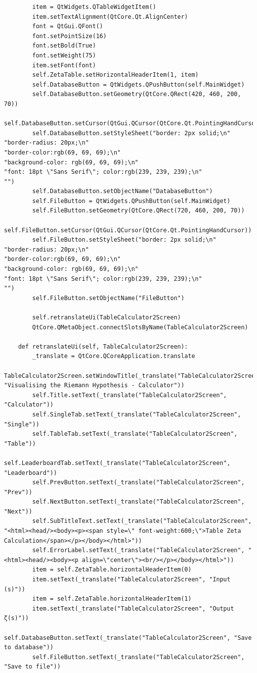 \documentclass{article}
\begin{document}
\begin{lstlisting}
        item = QtWidgets.QTableWidgetItem()
        item.setTextAlignment(QtCore.Qt.AlignCenter)
        font = QtGui.QFont()
        font.setPointSize(16)
        font.setBold(True)
        font.setWeight(75)
        item.setFont(font)
        self.ZetaTable.setHorizontalHeaderItem(1, item)
        self.DatabaseButton = QtWidgets.QPushButton(self.MainWidget)
        self.DatabaseButton.setGeometry(QtCore.QRect(420, 460, 200, 70))
        self.DatabaseButton.setCursor(QtGui.QCursor(QtCore.Qt.PointingHandCursor))
        self.DatabaseButton.setStyleSheet("border: 2px solid;\n"
"border-radius: 20px;\n"
"border-color:rgb(69, 69, 69);\n"
"background-color: rgb(69, 69, 69);\n"
"font: 18pt \"Sans Serif\"; color:rgb(239, 239, 239);\n"
"")
        self.DatabaseButton.setObjectName("DatabaseButton")
        self.FileButton = QtWidgets.QPushButton(self.MainWidget)
        self.FileButton.setGeometry(QtCore.QRect(720, 460, 200, 70))
        self.FileButton.setCursor(QtGui.QCursor(QtCore.Qt.PointingHandCursor))
        self.FileButton.setStyleSheet("border: 2px solid;\n"
"border-radius: 20px;\n"
"border-color:rgb(69, 69, 69);\n"
"background-color: rgb(69, 69, 69);\n"
"font: 18pt \"Sans Serif\"; color:rgb(239, 239, 239);\n"
"")
        self.FileButton.setObjectName("FileButton")

        self.retranslateUi(TableCalculator2Screen)
        QtCore.QMetaObject.connectSlotsByName(TableCalculator2Screen)

    def retranslateUi(self, TableCalculator2Screen):
        _translate = QtCore.QCoreApplication.translate
        TableCalculator2Screen.setWindowTitle(_translate("TableCalculator2Screen", "Visualising the Riemann Hypothesis - Calculator"))
        self.Title.setText(_translate("TableCalculator2Screen", "Calculator"))
        self.SingleTab.setText(_translate("TableCalculator2Screen", "Single"))
        self.TableTab.setText(_translate("TableCalculator2Screen", "Table"))
        self.LeaderboardTab.setText(_translate("TableCalculator2Screen", "Leaderboard"))
        self.PrevButton.setText(_translate("TableCalculator2Screen", "Prev"))
        self.NextButton.setText(_translate("TableCalculator2Screen", "Next"))
        self.SubTitleText.setText(_translate("TableCalculator2Screen", "<html><head/><body><p><span style=\" font-weight:600;\">Table Zeta Calculation</span></p></body></html>"))
        self.ErrorLabel.setText(_translate("TableCalculator2Screen", "<html><head/><body><p align=\"center\"><br/></p></body></html>"))
        item = self.ZetaTable.horizontalHeaderItem(0)
        item.setText(_translate("TableCalculator2Screen", "Input (s)"))
        item = self.ZetaTable.horizontalHeaderItem(1)
        item.setText(_translate("TableCalculator2Screen", "Output ζ(s)"))
        self.DatabaseButton.setText(_translate("TableCalculator2Screen", "Save to database"))
        self.FileButton.setText(_translate("TableCalculator2Screen", "Save to file"))
\end{lstlisting}
\end{document}
